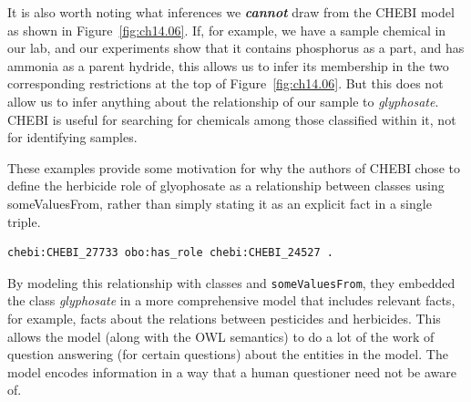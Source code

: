 It is also worth noting what inferences we \textbf{\textit{cannot}} draw from the CHEBI
model as shown in Figure~\ref{fig:ch14.06}. If, for example, we have a sample
chemical in our lab, and our experiments show that it contains
phosphorus as a part, and has ammonia as a parent hydride, this allows
us to infer its membership in the two corresponding restrictions at the
top of Figure~\ref{fig:ch14.06}. But this does not allow us to infer anything about
the relationship of our sample to \textit{glyphosate}. CHEBI is useful for
searching for chemicals among those classified within it, not for
identifying samples.

These examples provide some motivation for why the authors of CHEBI
chose to define the
herbicide role of glyophosate as a relationship between classes using
someValuesFrom, rather than simply stating it as an explicit fact in a
single triple.

\begin{lstlisting}
chebi:CHEBI_27733 obo:has_role chebi:CHEBI_24527 .
\end{lstlisting}

By modeling this relationship with classes and \texttt{someValuesFrom}, they
embedded the class \textit{glyphosate} in a more comprehensive model that
includes relevant facts, for example, facts about the relations between
pesticides and herbicides. This allows the model (along with the OWL
semantics) to do a lot of the work of question answering (for certain
questions) about the entities in the model. The model encodes
information in a way that a human questioner need not be aware of.

